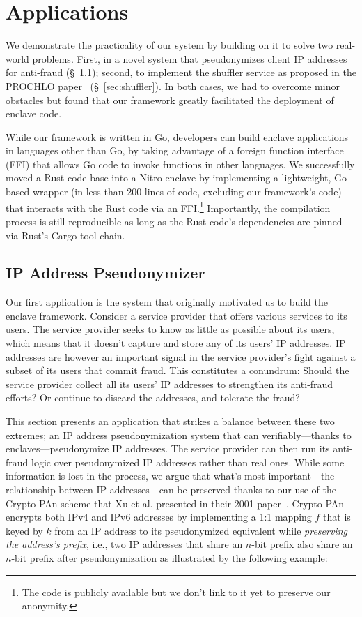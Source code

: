 \section{Applications}
\label{sec:applications}

We demonstrate the practicality of our system by building on it to solve two
real-world problems.  First, in a novel system that pseudonymizes client IP
addresses for anti-fraud (\S~\ref{sec:pseudonymization}); second, to implement
the shuffler service as proposed in the PROCHLO paper~\cite{Bittau2017a}
(\S~\ref{sec:shuffler}).  In both cases, we had to overcome minor obstacles but
found that our framework greatly facilitated the deployment of enclave code.

While our framework is written in Go, developers can build enclave applications
in languages other than Go, by taking advantage of a foreign function interface
(FFI) that allows Go code to invoke functions in other languages.  We
successfully moved a Rust code base into a Nitro enclave by implementing a
lightweight, Go-based wrapper (in less than 200 lines of code, excluding our
framework's code) that interacts with the Rust code via an FFI.\footnote{The
code is publicly available but we don't link to it yet to preserve our
anonymity.} Importantly, the compilation process is still reproducible as long
as the Rust code's dependencies are pinned via Rust's Cargo tool chain.

\subsection{IP Address Pseudonymizer}
\label{sec:pseudonymization}

Our first application is the system that originally motivated us to build the
enclave framework. Consider a service provider that offers various services to
its users.  The service provider seeks to know as little as possible about its
users, which means that it doesn't capture and store any of its users' IP
addresses.  IP addresses are however an important signal in the service
provider's fight against a subset of its users that commit fraud.  This
constitutes a conundrum: Should the service provider collect all its users' IP
addresses to strengthen its anti-fraud efforts?  Or continue to discard the
addresses, and tolerate the fraud?

This section presents an application that strikes a balance between these two
extremes; an IP address pseudonymization system that can verifiably---thanks to
enclaves---pseudonymize IP addresses.  The service provider can then run its
anti-fraud logic over pseudonymized IP addresses rather than real ones.  While
some information is lost in the process, we argue that what's most
important---the relationship between IP addresses---can be preserved thanks to
our use of the Crypto-PAn scheme that Xu et al. presented in their 2001
paper~\cite{Xu01a}.  Crypto-PAn encrypts both IPv4 and IPv6 addresses by
implementing a 1:1 mapping $f$ that is keyed by $k$ from an IP address to its
pseudonymized equivalent while \emph{preserving the address's prefix}, i.e., two
IP addresses that share an $n$-bit prefix also share an $n$-bit prefix after
pseudonymization as illustrated by the following example:

